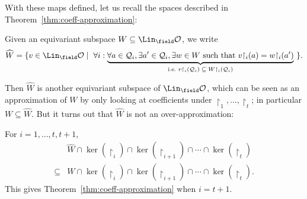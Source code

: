     With these maps defined, let us recall the spaces described in Theorem~\ref{thm:coeff-approximation}:
\begin{definition}
    Given an equivariant subspace $W \subseteq \Lin_\field \mathcal{O}$, 
    we write
    \[
        \widehat W 
        = \{ v \in \Lin_\field \mathcal{O} 
        \mid\ \forall i : 
            \underbrace{
                \forall a \in \mathcal{Q}_i, 
                \exists a' \in \mathcal{Q}_i, 
                \exists w \in W \text{ such that } 
                    v{\restriction_i}(a) = w{\restriction_i}(a')
            }_{\text{i.e.~$v{\restriction_i}(\mathcal{Q}_i) \subseteq W{\restriction_i}(\mathcal{Q}_i)$}} 
        \ \}.
    \]
\end{definition}
    Then $\widehat{W}$ is another equivariant subspace of $\Lin_\field \mathcal{O}$, 
    which can be seen as an approximation of $W$ by only looking at coefficients under $\restriction_1, \dots, \restriction_t$;
    in particular $W \subseteq \widehat W$.
    But it turns out that $\widehat{W}$ is not an over-approximation:
\begin{lemma}\label{lem:coeff-approximation}
    For $i = 1, \dots, t, t+1$,
    \begin{align*}
        &\widehat W \cap \ker(\restriction_i) \cap \ker(\restriction_{i+1}) \cap \cdots \cap \ker(\restriction_t) \\
        \subseteq{} &W \cap \ker(\restriction_i) \cap \ker(\restriction_{i+1}) \cap \cdots \cap \ker(\restriction_t).
    \end{align*}
    This gives Theorem~\ref{thm:coeff-approximation} when $i = t+1$.
\end{lemma}

